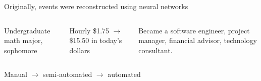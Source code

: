 \documentclass[aspectratio=169]{beamer}
\begin{document}
\begin{frame}{Originally, events were reconstructed using neural networks}
\begin{columns}
\begin{minipage}{\linewidth}
\tiny
\vspace{0.2 cm}
Undergraduate math major, sophomore

\vspace{0.2 cm}
Hourly \$1.75 $\to$ \$15.50 in today's dollars

\vspace{0.2 cm}
Became a software engineer, project manager, financial advisor, technology consultant.
\end{minipage}

\end{columns}
\end{frame}

\begin{frame}{Manual $\to$ semi-automated $\to$ automated}
\vspace{0.35 cm}
\begin{columns}

\end{columns}
\end{frame}
\end{document}
